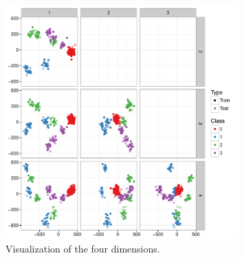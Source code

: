 \documentclass[a4paper,draft=false]{scrreprt}\usepackage[]{graphicx}\usepackage[]{color}
\begin{document}
\begin{figure}[hb]
\begin{center}
\includegraphics[width=0.8\textwidth]{visualization}
\caption{Visualization of the four dimensions.\label{fig:visualizations}}
\end{center}
\end{figure}


\appendix
\appendixpage
\end{document}
